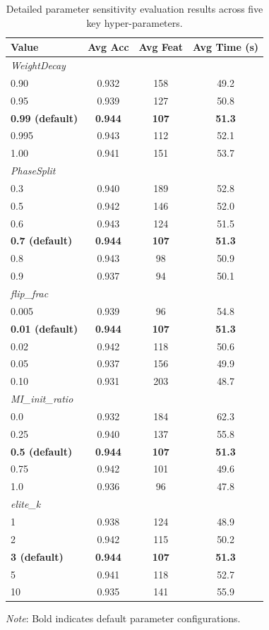 \begin{table}[!htb]
\centering
\caption{Detailed parameter sensitivity evaluation results across five key hyper-parameters.}
\label{T-A6}
\small
\setlength{\tabcolsep}{4pt}
\renewcommand{\arraystretch}{1.1}
\begin{tabular*}{\linewidth}{@{\extracolsep{\fill}}lccc@{}}
\toprule
Value & Avg Acc & Avg Feat & Avg Time (s) \\
\midrule
\multicolumn{4}{l}{\emph{WeightDecay}} \\
0.90 & 0.932 & 158 & 49.2 \\
0.95 & 0.939 & 127 & 50.8 \\
\textbf{0.99 (default)} & \textbf{0.944} & \textbf{107} & \textbf{51.3} \\
0.995 & 0.943 & 112 & 52.1 \\
1.00 & 0.941 & 151 & 53.7 \\
\multicolumn{4}{l}{\emph{PhaseSplit}} \\
0.3 & 0.940 & 189 & 52.8 \\
0.5 & 0.942 & 146 & 52.0 \\
0.6 & 0.943 & 124 & 51.5 \\
\textbf{0.7 (default)} & \textbf{0.944} & \textbf{107} & \textbf{51.3} \\
0.8 & 0.943 & 98 & 50.9 \\
0.9 & 0.937 & 94 & 50.1 \\
\multicolumn{4}{l}{\emph{flip\_frac}} \\
0.005 & 0.939 & 96 & 54.8 \\
\textbf{0.01 (default)} & \textbf{0.944} & \textbf{107} & \textbf{51.3} \\
0.02 & 0.942 & 118 & 50.6 \\
0.05 & 0.937 & 156 & 49.9 \\
0.10 & 0.931 & 203 & 48.7 \\
\multicolumn{4}{l}{\emph{MI\_init\_ratio}} \\
0.0 & 0.932 & 184 & 62.3 \\
0.25 & 0.940 & 137 & 55.8 \\
\textbf{0.5 (default)} & \textbf{0.944} & \textbf{107} & \textbf{51.3} \\
0.75 & 0.942 & 101 & 49.6 \\
1.0 & 0.936 & 96 & 47.8 \\
\multicolumn{4}{l}{\emph{elite\_k}} \\
1 & 0.938 & 124 & 48.9 \\
2 & 0.942 & 115 & 50.2 \\
\textbf{3 (default)} & \textbf{0.944} & \textbf{107} & \textbf{51.3} \\
5 & 0.941 & 118 & 52.7 \\
10 & 0.935 & 141 & 55.9 \\
\bottomrule
\end{tabular*}
\vspace{2pt}
\par\raggedright\footnotesize
\textit{Note}: Bold indicates default parameter configurations.
\end{table}
